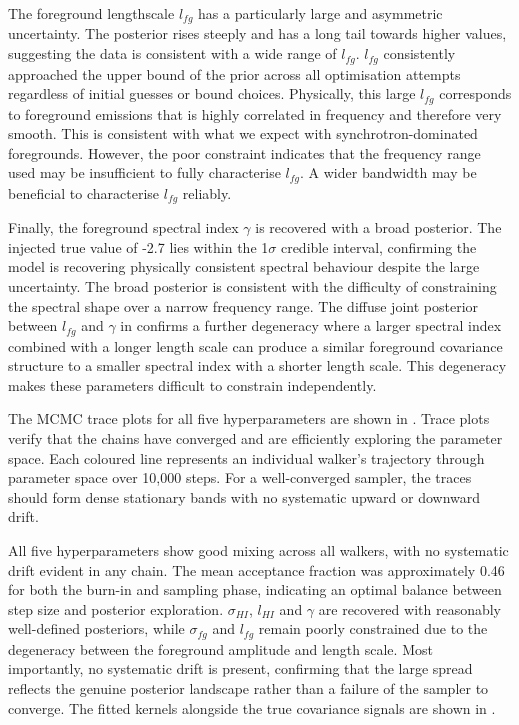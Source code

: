 The foreground lengthscale $l_{fg}$ has a particularly large and asymmetric uncertainty. The posterior rises steeply and has a long tail towards higher values, suggesting the data is consistent with a wide range of $l_{fg}$. $l_{fg}$ consistently approached the upper bound of the prior across all optimisation attempts regardless of initial guesses or bound choices. Physically, this large $l_{fg}$ corresponds to foreground emissions that is highly correlated in frequency and therefore very smooth. This is consistent with what we expect with synchrotron-dominated foregrounds. However, the poor constraint indicates that the frequency range used may be insufficient to fully characterise $l_{fg}$. A wider bandwidth may be beneficial to characterise $l_{fg}$ reliably.

Finally, the foreground spectral index $\gamma$ is recovered with a broad posterior. The injected true value of -2.7 lies within the 1$\sigma$ credible interval, confirming the model is recovering physically consistent spectral behaviour despite the large uncertainty. The broad posterior is consistent with the difficulty of constraining the spectral shape over a narrow frequency range. The diffuse joint posterior between $l_{fg}$ and $\gamma$ in  confirms a further degeneracy where a larger spectral index combined with a longer length scale can produce a similar foreground covariance structure to a smaller spectral index with a shorter length scale. This degeneracy makes these parameters difficult to constrain independently.

The MCMC trace plots for all five hyperparameters are shown in . Trace plots verify that the chains have converged and are efficiently exploring the parameter space. Each coloured line represents an individual walker's trajectory through parameter space over 10,000 steps. For a well-converged sampler, the traces should form dense stationary bands with no systematic upward or downward drift.

All five hyperparameters show good mixing across all walkers, with no systematic drift evident in any chain. The mean acceptance fraction was approximately 0.46 for both the burn-in and sampling phase, indicating an optimal balance between step size and posterior exploration. $\sigma_{HI}$, $l_{HI}$ and $\gamma$ are recovered with reasonably well-defined posteriors, while $\sigma_{fg}$ and $l_{fg}$ remain poorly constrained due to the degeneracy between the foreground amplitude and length scale. Most importantly, no systematic drift is present, confirming that the large spread reflects the genuine posterior landscape rather than a failure of the sampler to converge. The fitted kernels alongside the true covariance signals are shown in .

